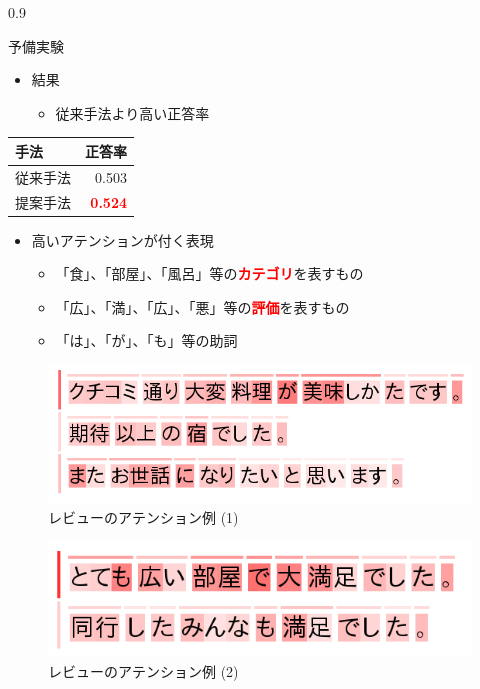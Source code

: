 \documentclass[unicode,10pt]{beamer}
\newlength{\mycolumnwidth}
\newcommand{\itemtitle}[1]{#1\\}
\newcommand{\fire}[1]{\textcolor{red}{\textbf{#1}}}
\begin{document}
\begin{frame}[t]
\begin{columns}[onlytextwidth,t]
\begin{column}{0.9\mycolumnwidth}
\begin{block}{予備実験}
\begin{itemize}
        \item \itemtitle{結果}
          \begin{itemize}
            \item 従来手法より高い正答率
          \end{itemize}
      \end{itemize}

      \begin{table}
        \centering
        \begin{tabular}{l | r}
          手法 & 正答率 \\
          \hline
          従来手法  & 0.503        \\
          提案手法  & \fire{0.524} \\
        \end{tabular}
      \end{table}
      \begin{itemize}
        \item 高いアテンションが付く表現
          \begin{itemize}
            \item 「食」、「部屋」、「風呂」等の\fire{カテゴリ}を表すもの
            \item 「広」、「満」、「広」、「悪」等の\fire{評価}を表すもの
            \item 「は」、「が」、「も」等の助詞
          \end{itemize}
      \end{itemize}

      \begin{figure}
        \centering
        \includegraphics[width=0.9\linewidth]{fig/review_1.png}
        \caption*{レビューのアテンション例 (1)}
      \end{figure}

      \begin{figure}
        \centering
        \includegraphics[width=0.8\linewidth]{fig/review_2.png}
        \caption*{レビューのアテンション例 (2)}
      \end{figure}
    \end{block}


\end{column}
\end{columns}
\end{frame}
\end{document}
